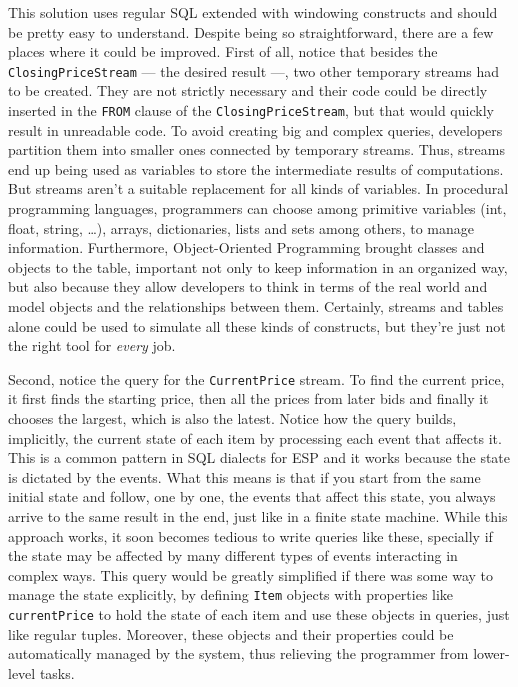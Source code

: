 \documentclass{report}
\begin{document}
This solution uses regular SQL extended with windowing constructs and
should be pretty easy to understand. Despite being so straightforward,
there are a few places where it could be improved. First of all,
notice that besides the \verb=ClosingPriceStream= --- the desired
result ---, two other temporary streams had to be created. They are
not strictly necessary and their code could be directly inserted in
the \verb=FROM= clause of the \verb=ClosingPriceStream=, but that
would quickly result in unreadable code. To avoid creating big and
complex queries, developers partition them into smaller ones connected
by temporary streams. Thus, streams end up being used as variables to
store the intermediate results of computations. But streams aren't a
suitable replacement for all kinds of variables. In procedural
programming languages, programmers can choose among primitive
variables (int, float, string, \dots), arrays, dictionaries, lists and
sets among others, to manage information. Furthermore, Object-Oriented
Programming brought classes and objects to the table, important not
only to keep information in an organized way, but also because they
allow developers to think in terms of the real world and model objects
and the relationships between them. Certainly, streams and tables
alone could be used to simulate all these kinds of constructs, but
they're just not the right tool for \emph{every} job.

Second, notice the query for the \verb=CurrentPrice= stream. To find
the current price, it first finds the starting price, then all the
prices from later bids and finally it chooses the largest, which is
also the latest. Notice how the query builds, implicitly, the current
state of each item by processing each event that affects it. This is a
common pattern in SQL dialects for ESP and it works because the state
is dictated by the events. What this means is that if you start from
the same initial state and follow, one by one, the events that affect
this state, you always arrive to the same result in the end, just like
in a finite state machine. While this approach works, it soon becomes
tedious to write queries like these, specially if the state may be
affected by many different types of events interacting in complex
ways. This query would be greatly simplified if there was some way to
manage the state explicitly, by defining \verb=Item= objects with
properties like \verb=currentPrice= to hold the state of each item and
use these objects in queries, just like regular tuples. Moreover,
these objects and their properties could be automatically managed by
the system, thus relieving the programmer from lower-level tasks.
\end{document}
